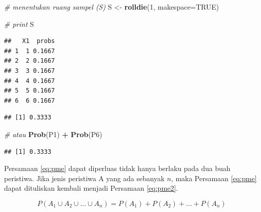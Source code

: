 \documentclass[]{book}
\newenvironment{Shaded}{\begin{snugshade}}{\end{snugshade}}
\newcommand{\KeywordTok}[1]{\textcolor[rgb]{0.13,0.29,0.53}{\textbf{#1}}}
\newcommand{\DataTypeTok}[1]{\textcolor[rgb]{0.13,0.29,0.53}{#1}}
\newcommand{\DecValTok}[1]{\textcolor[rgb]{0.00,0.00,0.81}{#1}}
\newcommand{\StringTok}[1]{\textcolor[rgb]{0.31,0.60,0.02}{#1}}
\newcommand{\CommentTok}[1]{\textcolor[rgb]{0.56,0.35,0.01}{\textit{#1}}}
\newcommand{\OtherTok}[1]{\textcolor[rgb]{0.56,0.35,0.01}{#1}}
\newcommand{\OperatorTok}[1]{\textcolor[rgb]{0.81,0.36,0.00}{\textbf{#1}}}
\newcommand{\NormalTok}[1]{#1}
\begin{document}
\begin{Shaded}
\begin{Highlighting}[]
\CommentTok{# menentukan ruang sampel (S)}
\NormalTok{S <-}\StringTok{ }\KeywordTok{rolldie}\NormalTok{(}\DecValTok{1}\NormalTok{, }\DataTypeTok{makespace=}\OtherTok{TRUE}\NormalTok{)}

\CommentTok{# print}
\NormalTok{S}
\end{Highlighting}
\end{Shaded}

\begin{verbatim}
##   X1  probs
## 1  1 0.1667
## 2  2 0.1667
## 3  3 0.1667
## 4  4 0.1667
## 5  5 0.1667
## 6  6 0.1667
\end{verbatim}

\begin{Shaded}
\end{Shaded}

\begin{verbatim}
## [1] 0.3333
\end{verbatim}

\begin{Shaded}
\begin{Highlighting}[]
\CommentTok{# atau}
\KeywordTok{Prob}\NormalTok{(P1) }\OperatorTok{+}\StringTok{ }\KeywordTok{Prob}\NormalTok{(P6)}
\end{Highlighting}
\end{Shaded}

\begin{verbatim}
## [1] 0.3333
\end{verbatim}

Persamaan \eqref{eq:pme} dapat diperluas tidak hanya berlaku pada dua buah
peristiwa. Jika jenis peristiwa A yang ada sebanyak \(n\), maka
Persamaan \eqref{eq:pme} dapat dituliskan kembali menjadi Persamaan
\eqref{eq:pme2}.

\begin{equation}
   P\left(A_1\cup A_2\cup...\cup A_n\right)=P\left(A_1\right)+P\left(A_2\right)+...+P\left(A_n\right)
  \label{eq:pme2}
\end{equation}
\end{document}
